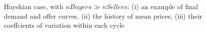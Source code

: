 \documentclass[12pt]{report}
\begin{document}
\begin{appendices}
\begin{figure}[htbp]
\begin{center}
\caption{Hayekian case, with $nBuyers \gg nSellers$: (i) an example of final demand and offer curves, (ii) the history of mean prices, (iii) their coeffcients of variation within each cycle}
\label{output_3_1a.png}
\end{center}
\end{figure}


\end{appendices}
\end{document}
